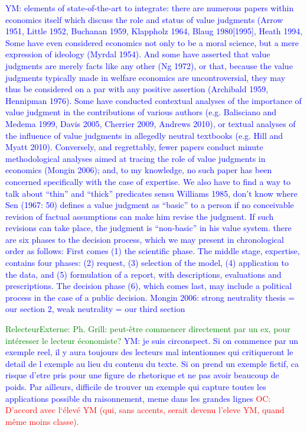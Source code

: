 \documentclass[preprint, french, english, 11pt]{elsarticle}%
\newcommand{\commentYM}[1]{\textcolor{blue}{YM: #1}}
\newcommand{\commentOC}[1]{\textcolor{red}{OC: #1}}
\newcommand{\commentE}[1]{\textcolor{green}{RelecteurExterne: #1}}
\begin{document}
\commentYM{elements of state-of-the-art to integrate: there are numerous papers within economics itself
which discuss the role and status of value judgments (Arrow 1951, Little 1952,
Buchanan 1959, Klappholz 1964, Blaug 1980[1995], Heath 1994, Some have
even considered economics not only to be a moral science, but a mere expression
of ideology (Myrdal 1954). And some have asserted that value judgments
are merely facts like any other (Ng 1972), or that, because the value judgments
typically made in welfare economics are uncontroversial, they may thus be considered
on a par with any positive assertion (Archibald 1959, Hennipman 1976).
Some have conducted contextual analyses of the importance of value judgment
in the contributions of various authors (e.g. Balisciano and Medema 1999, Davis
2005, Cherrier 2009, Andrews 2010), or textual analyses of the influence of value
judgments in allegedly neutral textbooks (e.g. Hill and Myatt 2010). Conversely,
and regrettably, fewer papers conduct minute methodological analyses aimed at
tracing the role of value judgments in economics (Mongin 2006); and, to my
knowledge, no such paper has been concerned specifically with the case of expertise.
We also have to find a way to talk about ``thin'' and ``thick'' predicates sensu Williams 1985, don't know where
Sen (1967: 50) defines a value judgment
as “basic” to a person if no conceivable revision of factual assumptions can
make him revise the judgment. If such revisions can take place, the judgment is
“non-basic” in his value system.
there are six phases to the decision
process, which we may present in chronological order as follows: First comes
(1) the scientific phase. The middle stage, expertise, contains four phases: (2) request,
(3) selection of the model, (4) application to the data, and (5) formulation of
a report, with descriptions, evaluations and prescriptions. The decision phase (6),
which comes last, may include a political process in the case of a public decision.
Mongin 2006: strong neutrality thesis = our section 2, weak neutrality = our third section}

\commentE{Ph. Grill: peut-être commencer directement par un ex, pour intéresser le lecteur économiste?}
\commentYM{je suis circonspect. Si on commence par un exemple reel, il y aura toujours des lecteurs mal intentionnes qui critiqueront le detail de l exemple au lieu du contenu du texte. Si on prend un exemple fictif, ca risque d'etre pris pour une figure de rhetorique et ne pas avoir beaucoup de poids. Par ailleurs, difficile de trouver un exemple qui capture toutes les applications possible du raisonnement, meme dans les grandes lignes}
\commentOC{D’accord avec l‘élevé YM (qui, sans accents, serait devenu l’eleve YM, quand même moins classe).}
\end{document}
